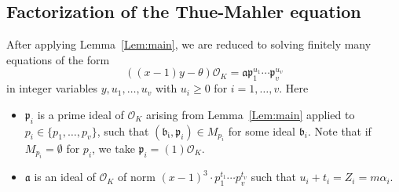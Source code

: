 {%
%
%

\subsection{Factorization of the Thue-Mahler equation}

After applying Lemma~\ref{Lem:main}, we are reduced to solving finitely many equations of the form
\begin{equation}\label{Eq:TMfactored}
((x-1) y- \theta)\mathcal{O}_K=\mathfrak{a} \mathfrak{p}_1^{u_1}\cdots \mathfrak{p}_v^{u_v}
\end{equation}
in integer variables $y,u_1, \dots, u_v$ with $u_i \geq 0$ for $i = 1, \dots, v$. Here
\begin{itemize}
\item $\mathfrak{p}_i$ is a prime ideal of $\mathcal{O}_K$ arising from Lemma~\ref{Lem:main} applied to $p_i \in \{p_1, \dots, p_v\}$, such that $(\mathfrak{b_i}, \mathfrak{p}_i) \in M_{p_i}$ for some ideal $\mathfrak{b}_i$. Note that if $M_{p_i} = \emptyset$ for $p_i$, we take $\mathfrak{p}_i = (1)\mathcal{O}_K$. 
\item $\mathfrak{a}$ is an ideal of $\mathcal{O}_K$ of norm $(x-1)^3\cdot p_1^{t_1} \cdots p_v^{t_v}$ such that
$u_i + t_i =  Z_i = m\alpha_i$.
\end{itemize}

}
